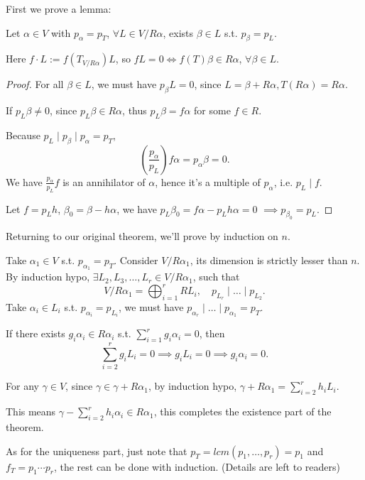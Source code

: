First we prove a lemma:
\begin{lemma}
	Let $\alpha\in V$ with $p_\alpha = p_T$, $\forall L \in V / R\alpha$,
	exists $\beta\in L$ s.t. $p_\beta = p_L$.

	Here $f\cdot L := f(T_{V / R\alpha}) L$, so $fL=0\iff f(T)\beta\in R\alpha$,
	$\forall \beta\in L$.
\end{lemma}
\begin{proof}[Proof]
    For all $\beta\in L$, we must have $p_\beta L=0$,
	since $L = \beta + R\alpha, T(R\alpha) = R\alpha$.

	If $p_L\beta \ne 0$, since $p_L \beta\in R\alpha$,
	thus $p_L \beta = f\alpha$ for some $f\in R$.

	Because $p_L \mid p_\beta \mid p_\alpha = p_T$,
	\[
	\left( \frac{p_\alpha}{p_L} \right)f\alpha = p_\alpha \beta = 0.
	\]
	We have $\frac{p_\alpha}{p_L}f$ is an annihilator of $\alpha$,
	hence it's a multiple of $p_\alpha$, i.e.  $p_L \mid f$.

	Let $f = p_L h$, $\beta_0 = \beta - h\alpha$,
	we have $p_L\beta_0 = f\alpha - p_L h \alpha = 0$
	$\implies p_{\beta_0} = p_L$.
\end{proof}

Returning to our original theorem,
we'll prove by induction on $n$.

Take $\alpha_1\in V$ s.t. $p_{\alpha_1} = p_T$.
Consider $V / R\alpha_1$, its dimension is strictly lesser than $n$.
By induction hypo, $\exists L_2, L_3, \dots, L_r\in V / R\alpha_1$,
such that
\[
V / R\alpha_1 = \bigoplus _{i=1}^r RL_i, \quad p_{L_r}\mid \dots \mid p_{L_2}.
\]
Take $\alpha_i \in L_i$ s.t. $p_{\alpha_i} = p_{L_i}$,
we must have $p_{\alpha_r} \mid \dots \mid p_{\alpha_1} = p_T$.

If there exists $g_i\alpha_i \in R\alpha_i$ s.t. $\sum_{i=1}^r g_i\alpha_i = 0$,
then
\[
	\sum_{i=2}^r g_iL_i = 0 \implies g_i L_i = 0 \implies g_i\alpha_i = 0.
\]

For any $\gamma \in V$, since $\gamma \in \gamma+R\alpha_1$,
by induction hypo, $\gamma + R\alpha_1 = \sum_{i=2}^{r} h_iL_i$.

This means $\gamma - \sum_{i=2}^{r} h_i \alpha_i \in R\alpha_1$,
this completes the existence part of the theorem.
\vspace{1ex}

As for the uniqueness part,
just note that $p_T = lcm(p_1,\dots,p_r) = p_1$ and $f_T = p_1\cdots p_r$,
the rest can be done with induction. (Details are left to readers)

